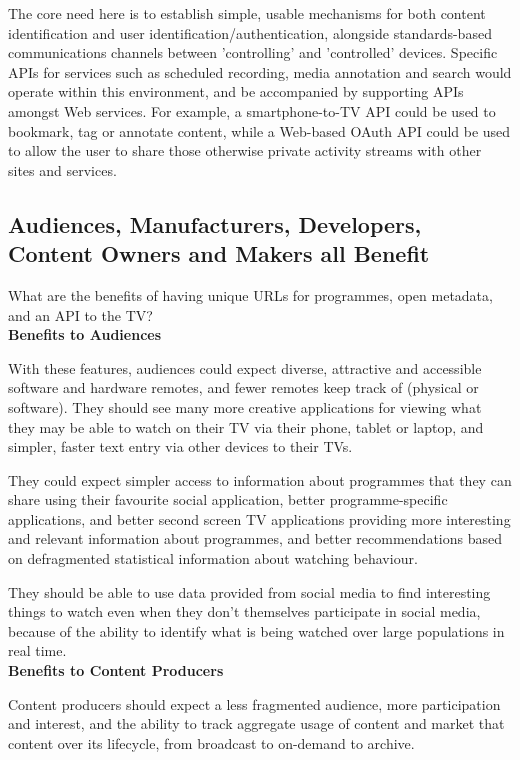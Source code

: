 \documentclass[]{article}%
\begin{document}
The core need here is to establish simple, usable mechanisms for both content identification and user identification/authentication, alongside standards-based communications channels between 'controlling' and 'controlled' devices. Specific APIs for services such as scheduled recording, media annotation and search would operate within this environment, and be accompanied by supporting APIs amongst Web services. For example, a smartphone-to-TV API could be used to bookmark, tag or annotate content, while a Web-based OAuth API could be used to allow the user to share those otherwise private activity streams with other sites and services.

\subsection{Audiences, Manufacturers, Developers, Content Owners and Makers all Benefit}

What are the benefits of having unique URLs for programmes, open metadata, and an API to the TV?
\\

{\bf{Benefits to Audiences}}

With these features, audiences could expect diverse, attractive and accessible software and hardware remotes, and fewer remotes keep track of (physical or software). They should see many more creative applications for viewing what they may be able to watch on their TV via their phone, tablet or laptop, and simpler, faster text entry via other devices to their TVs. 

They could expect simpler access to information about programmes that they can share using their favourite social application, better programme-specific applications, and better second screen TV applications providing more interesting and relevant information about programmes, and better recommendations based on defragmented statistical information about watching behaviour.

They should be able to use data provided from social media to find interesting things to watch even when they don't themselves participate in social media, because of the ability to identify what is being watched over large populations in real time.
\\

{\bf{Benefits to Content Producers}}

Content producers should expect a less fragmented audience, more participation and interest, and the ability to track aggregate usage of content and market that content over its lifecycle, from broadcast to on-demand to archive.
\\
\end{document}
